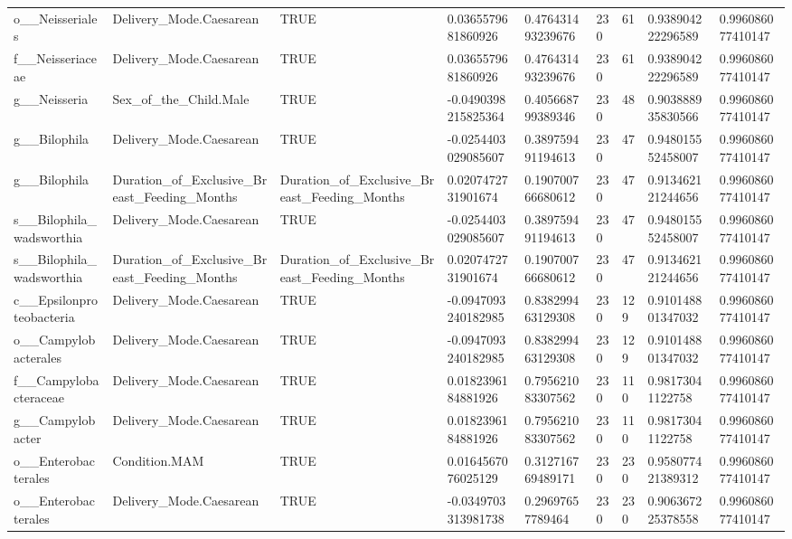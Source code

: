 \begin{longtable}{lllllllll}
o\_\_Neisseriales & Delivery\_Mode.Caesarean & TRUE & 0.0365579681860926 & 0.476431493239676 & 230 & 61 & 0.938904222296589 & 0.996086077410147 \\
f\_\_Neisseriaceae & Delivery\_Mode.Caesarean & TRUE & 0.0365579681860926 & 0.476431493239676 & 230 & 61 & 0.938904222296589 & 0.996086077410147 \\
g\_\_Neisseria & Sex\_of\_the\_Child.Male & TRUE & -0.0490398215825364 & 0.405668799389346 & 230 & 48 & 0.903888935830566 & 0.996086077410147 \\
g\_\_Bilophila & Delivery\_Mode.Caesarean & TRUE & -0.0254403029085607 & 0.389759491194613 & 230 & 47 & 0.948015552458007 & 0.996086077410147 \\
g\_\_Bilophila & Duration\_of\_Exclusive\_Breast\_Feeding\_Months & Duration\_of\_Exclusive\_Breast\_Feeding\_Months & 0.0207472731901674 & 0.190700766680612 & 230 & 47 & 0.913462121244656 & 0.996086077410147 \\
s\_\_Bilophila\_wadsworthia & Delivery\_Mode.Caesarean & TRUE & -0.0254403029085607 & 0.389759491194613 & 230 & 47 & 0.948015552458007 & 0.996086077410147 \\
s\_\_Bilophila\_wadsworthia & Duration\_of\_Exclusive\_Breast\_Feeding\_Months & Duration\_of\_Exclusive\_Breast\_Feeding\_Months & 0.0207472731901674 & 0.190700766680612 & 230 & 47 & 0.913462121244656 & 0.996086077410147 \\
c\_\_Epsilonproteobacteria & Delivery\_Mode.Caesarean & TRUE & -0.0947093240182985 & 0.838299463129308 & 230 & 129 & 0.910148801347032 & 0.996086077410147 \\
o\_\_Campylobacterales & Delivery\_Mode.Caesarean & TRUE & -0.0947093240182985 & 0.838299463129308 & 230 & 129 & 0.910148801347032 & 0.996086077410147 \\
f\_\_Campylobacteraceae & Delivery\_Mode.Caesarean & TRUE & 0.0182396184881926 & 0.795621083307562 & 230 & 110 & 0.98173041122758 & 0.996086077410147 \\
g\_\_Campylobacter & Delivery\_Mode.Caesarean & TRUE & 0.0182396184881926 & 0.795621083307562 & 230 & 110 & 0.98173041122758 & 0.996086077410147 \\
o\_\_Enterobacterales & Condition.MAM & TRUE & 0.0164567076025129 & 0.312716769489171 & 230 & 230 & 0.958077421389312 & 0.996086077410147 \\
o\_\_Enterobacterales & Delivery\_Mode.Caesarean & TRUE & -0.0349703313981738 & 0.29697657789464 & 230 & 230 & 0.906367225378558 & 0.996086077410147 \\

\end{longtable}
